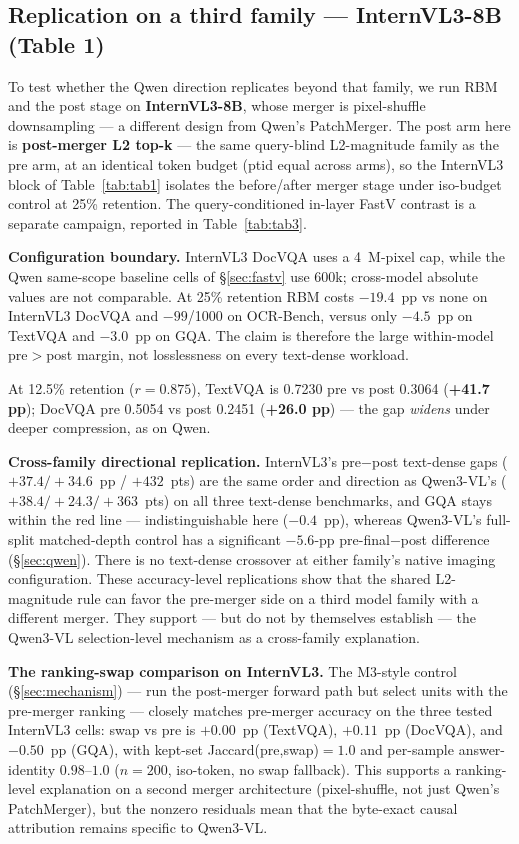 \documentclass[sigconf,nonacm]{acmart}
\begin{document}
\subsection{Replication on a third family --- InternVL3-8B (Table 1)}\label{sec:internvl}

To test whether the Qwen direction replicates beyond that family, we run RBM
and the post stage on \textbf{InternVL3-8B},
whose merger is pixel-shuffle downsampling --- a different design from Qwen's
PatchMerger. The post arm here is \textbf{post-merger L2 top-k} --- the
same query-blind L2-magnitude family as the pre arm, at an identical
token budget (ptid equal across arms), so the InternVL3 block of
Table~\ref{tab:tab1} isolates the before/after merger stage under iso-budget
control at 25\% retention. The query-conditioned in-layer FastV contrast is a separate campaign,
reported in Table~\ref{tab:tab3}.

\textbf{Configuration boundary.} InternVL3 DocVQA uses a 4~M-pixel cap, while
the Qwen same-scope baseline cells of \S\ref{sec:fastv} use 600k; cross-model
absolute values are not comparable. At 25\% retention RBM costs $-19.4$~pp vs
none on InternVL3 DocVQA and $-99$/1000 on OCR-Bench, versus only $-4.5$~pp on
TextVQA and $-3.0$~pp on GQA. The claim is therefore the large within-model
pre$>$post margin, not losslessness on every text-dense workload.

At 12.5\% retention ($r=0.875$), TextVQA is 0.7230 pre
vs post 0.3064 (\textbf{+41.7 pp}); DocVQA pre 0.5054 vs post 0.2451
(\textbf{+26.0 pp}) --- the gap \emph{widens} under deeper compression, as on
Qwen.

\textbf{Cross-family directional replication.} InternVL3's pre$-$post text-dense gaps
($+37.4 / +34.6$~pp / $+432$~pts) are the same order and direction as
Qwen3-VL's ($+38.4 / +24.3 / +363$~pts) on all three text-dense benchmarks, and
GQA stays within the red line --- indistinguishable here ($-0.4$~pp), whereas
Qwen3-VL's full-split matched-depth control has a significant $-5.6$-pp
pre-final$-$post difference (\S\ref{sec:qwen}). There is no text-dense crossover
at either family's native imaging configuration. These
accuracy-level replications show that the shared L2-magnitude rule can favor
the pre-merger side on a third model family with a different merger. They support
--- but do not by themselves establish --- the Qwen3-VL selection-level
mechanism as a cross-family explanation.

\textbf{The ranking-swap comparison on InternVL3.} The M3-style control
(\S\ref{sec:mechanism}) --- run the post-merger forward path but select units
with the pre-merger ranking --- closely matches pre-merger accuracy on the
three tested InternVL3 cells: swap vs pre is $+0.00$~pp (TextVQA), $+0.11$~pp
(DocVQA), and $-0.50$~pp (GQA), with kept-set Jaccard(pre,swap)$= 1.0$ and
per-sample answer-identity $0.98$--$1.0$ ($n=200$, iso-token, no swap
fallback). This supports a ranking-level explanation on a second merger
architecture (pixel-shuffle, not just Qwen's PatchMerger), but the nonzero
residuals mean that the byte-exact causal attribution remains specific to
Qwen3-VL.
\end{document}
